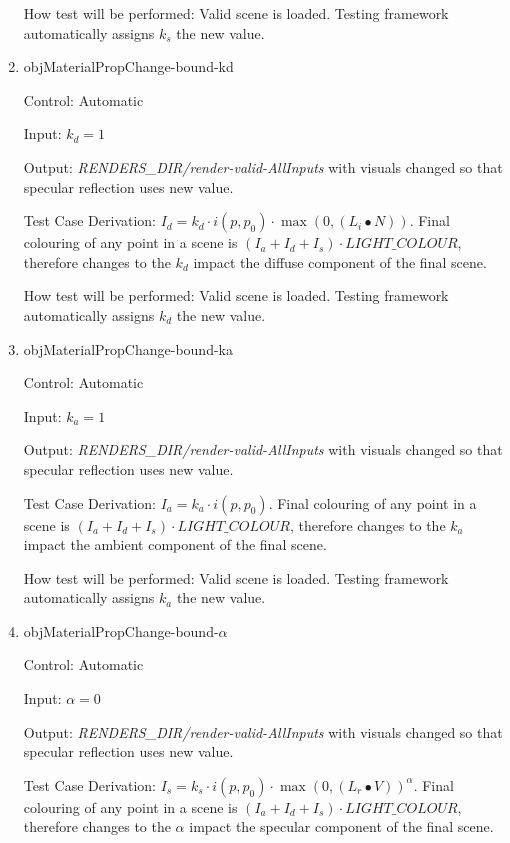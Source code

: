 \documentclass[12pt, titlepage]{article}
\begin{document}
\begin{enumerate}
	How test will be performed: Valid scene is loaded. Testing framework 
	automatically assigns $k_{s}$ the new value. 
	
	\item{objMaterialPropChange-bound-kd\\}
	
	Control: Automatic
	
	Input: $k_{d} = 1$
	
	Output: \textit{RENDERS\_DIR/render-valid-AllInputs} with visuals changed 
	so that specular reflection uses new value.
	
	Test Case Derivation: $I_{d} = k_{d}\cdot i(p,p_{0}) \cdot 
	\max(0,(L_{i}\bullet N))$. Final colouring of any point in a scene is 
	$(I_{a}+I_{d}+I_{s})\cdot LIGHT\_COLOUR$, therefore changes to the $k_{d}$ 
	impact the diffuse component of the final scene.
	
	How test will be performed: Valid scene is loaded. Testing framework 
	automatically assigns $k_{d}$ the new value. 	
	
	\item{objMaterialPropChange-bound-ka\\}
	
	Control: Automatic
	
	Input: $k_{a} = 1$
	
	Output: \textit{RENDERS\_DIR/render-valid-AllInputs} with visuals changed 
	so that specular reflection uses new value.
	
	Test Case Derivation: $I_{a} = k_{a}\cdot i(p,p_{0})$. Final colouring of 
	any point in a scene is $(I_{a}+I_{d}+I_{s})\cdot LIGHT\_COLOUR$, therefore 
	changes to the $k_{a}$ impact the ambient component of the final scene.
	
	How test will be performed: Valid scene is loaded. Testing framework 
	automatically assigns $k_{a}$ the new value. 
	
	\item{objMaterialPropChange-bound-$\alpha$\\}
	
	Control: Automatic
	
	Input: $\alpha = 0$
	
	Output: \textit{RENDERS\_DIR/render-valid-AllInputs} with visuals changed 
	so that specular reflection uses new value.
	
	Test Case Derivation: $I_{s} = k_{s}\cdot i(p,p_{0}) \cdot \max(0, 
	({L_{r}}\bullet V))^\alpha$. Final colouring of any point in a scene is 
	$(I_{a}+I_{d}+I_{s})\cdot LIGHT\_COLOUR$, therefore changes to the $\alpha$ 
	impact the specular component of the final scene.
	

\end{enumerate}
\end{document}
